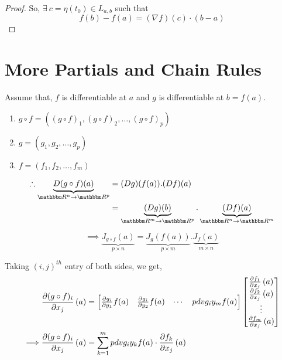 \documentclass[Analysis-3]{subfiles}
\begin{document}
\begin{proof}
    So, $\exists\ c = \eta(t_0) \in L_{a,b}$ such that \[ f(b) - f(a) = (\nabla f)(c)\cdot(b-a) \]
\end{proof}

\section{More Partials and Chain Rules}

Assume that, $f$ is differentiable at $a$ and $g$ is differentiable at $b = f(a)$.

\begin{notnBox}
    \begin{enumerate}
        \item $g \circ f = \left( (g \circ f)_1 , (g \circ f)_2 , \ldots, (g \circ f)_p \right)$
        \item $g = \left( g_1, g_2, \ldots, g_p \right)$
        \item $f = \left( f_1, f_2, \ldots, f_m \right)$
    \end{enumerate}
\end{notnBox}


\begin{align*}
    \therefore    \underbrace{D(g \circ f)(a)}_{\R^n \to \R^p} & = (Dg)(f(a)).(Df)(a)                                                          \\
                                                               & = \underbrace{(Dg)(b)}_{\R^m \to \R^p} . \underbrace{(Df)(a)}_{\R^n \to \R^m}
\end{align*}

\[\implies \underbrace{J_{g \circ f}(a)}_{p \times n} = \underbrace{J_{g}(f(a))}_{p \times m} . \underbrace{J_{f}(a)}_{m \times n} \]

Taking $(i,j)^{th}$ entry of both sides, we get,
\begin{align*}
             & \pdv{(g\circ f)_{i}}{x_j}\left( a \right) = \begin{bmatrix}
                                                               \pdv{g_i}{y_1}f(a) & \pdv{g_i}{y_2}f(a) & \cdots & pdv{g_i}{y_m}f(a)
                                                           \end{bmatrix} \begin{bmatrix}
                                                                             \pdv{f_1}{x_j}\left( a \right) \\
                                                                             \pdv{f_2}{x_j}\left( a \right) \\
                                                                             \vdots                         \\
                                                                             \pdv{f_m}{x_j}\left( a \right)
                                                                         \end{bmatrix}    \\
    \implies & \pdv{(g\circ f)_{i}}{x_j}\left( a \right) = \sum_{k = 1}^{m}   pdv{g_i}{y_k}f(a)\cdot\pdv{f_k}{x_j}\left( a \right)
\end{align*}
\end{document}
